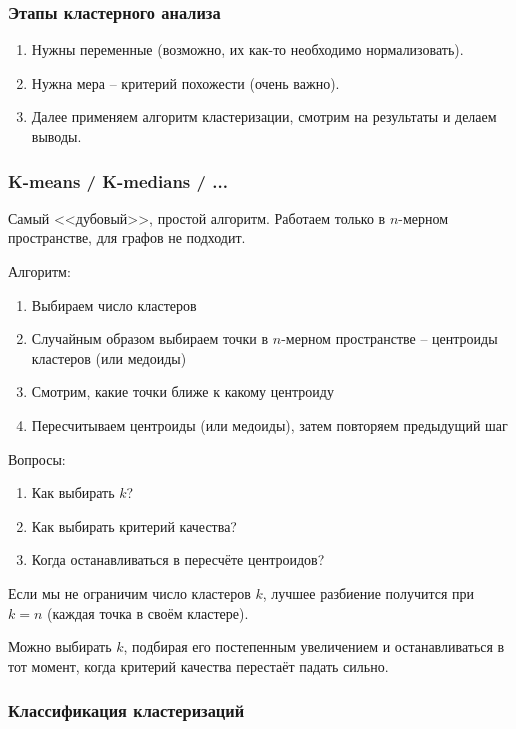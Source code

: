 \documentclass[main.tex]{subfiles}
\begin{document}
\subsubsection{Этапы кластерного анализа}

\begin{enumerate}[noitemsep]
	\item Нужны переменные (возможно, их как-то необходимо нормализовать).
	\item Нужна мера -- критерий похожести (очень важно).
	\item Далее применяем алгоритм кластеризации, смотрим на результаты и делаем выводы.
\end{enumerate}

\subsubsection{K-means / K-medians / ...}

Самый <<дубовый>>, простой алгоритм.
Работаем только в $n$-мерном пространстве, для графов не подходит.

Алгоритм:

\begin{enumerate}[noitemsep]
	\item Выбираем число кластеров
	\item Случайным образом выбираем точки в $n$-мерном пространстве -- центроиды кластеров (или медоиды)
	\item Смотрим, какие точки ближе к какому центроиду
	\item Пересчитываем центроиды (или медоиды), затем повторяем предыдущий шаг
\end{enumerate}

Вопросы:

\begin{enumerate}[noitemsep]
	\item Как выбирать $k$?
	\item Как выбирать критерий качества?
	\item Когда останавливаться в пересчёте центроидов?
\end{enumerate}

Если мы не ограничим число кластеров $k$, лучшее разбиение получится при $k=n$ (каждая точка в своём кластере).

Можно выбирать $k$, подбирая его постепенным увеличением и останавливаться в тот момент, когда критерий качества перестаёт падать сильно.

\subsubsection{Классификация кластеризаций}
\end{document}
